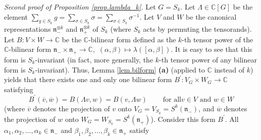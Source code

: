 \documentclass
[numbers=enddot,12pt,final,onecolumn,german,notitlepage]{scrartcl}%
\theoremstyle{definition}
\begin{document}
\textit{Second proof of Proposition \ref{prop.lambda_k}.} Let $G=S_{k}$. Let
$\Lambda\in\mathbb{C}\left[  G\right]  $ be the element $\sum\limits_{g\in
S_{k}}g=\sum\limits_{\sigma\in S_{k}}\sigma=\sum\limits_{\sigma\in S_{k}%
}\sigma^{-1}$. Let $V$ and $W$ be the canonical representations $\mathfrak{n}%
_{-}^{\otimes k}$ and $\mathfrak{n}_{+}^{\otimes k}$ of $S_{k}$ (where $S_{k}$
acts by permuting the tensorands). Let $B:V\times W\rightarrow\mathbb{C}$ be
the $\mathbb{C}$-bilinear form defined as the $k$-th tensor power of the
$\mathbb{C}$-bilinear form $\mathfrak{n}_{-}\times\mathfrak{n}_{+}%
\rightarrow\mathbb{C},$ $\left(  \alpha,\beta\right)  \mapsto\lambda\left(
\left[  \alpha,\beta\right]  \right)  $. It is easy to see that this form is
$S_{k}$-invariant (in fact, more generally, the $k$-th tensor power of any
bilinear form is $S_{k}$-invariant). Thus, Lemma \ref{lem.bilform}
\textbf{(a)} (applied to $\mathbb{C}$ instead of $k$) yields that there exists
one and only one bilinear form $B^{\prime}:V_{G}\times W_{G}\rightarrow
\mathbb{C}$ satisfying%
\begin{equation}
B^{\prime}\left(  \overline{v},\overline{w}\right)  =B\left(  \Lambda
v,w\right)  =B\left(  v,\Lambda w\right)  \ \ \ \ \ \ \ \ \ \ \text{for all
}v\in V\text{ and }w\in W \label{thm.invformnondeg.pf.B'}%
\end{equation}
(where $\overline{v}$ denotes the projection of $v$ onto $V_{G}=V_{S_{k}%
}=S^{k}\left(  \mathfrak{n}_{-}\right)  $, and $\overline{w}$ denotes the
projection of $w$ onto $W_{G}=W_{S_{k}}=S^{k}\left(  \mathfrak{n}_{+}\right)
$). Consider this form $B^{\prime}$. All $\alpha_{1},\alpha_{2},...,\alpha
_{k}\in\mathfrak{n}_{-}$ and $\beta_{1},\beta_{2},...,\beta_{k}\in
\mathfrak{n}_{+}$ satisfy%
\end{document}
